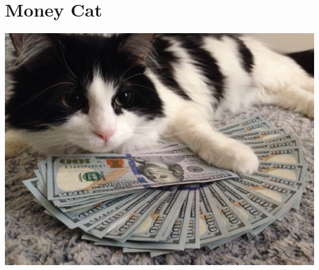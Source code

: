 \documentclass[../example.tex]{subfiles}
\begin{document}
\section{Money Cat}
\includegraphics[scale=0.5]{./mkisser/img/image.png}
\end{document}
